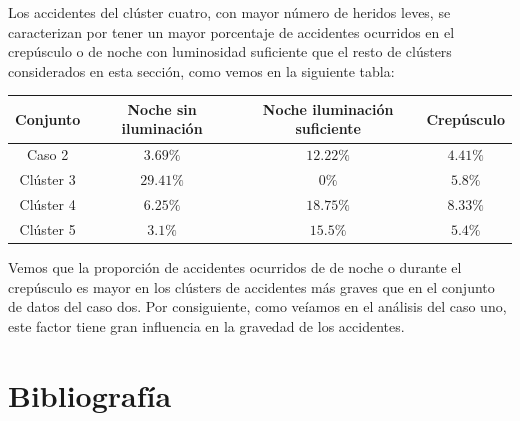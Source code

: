 \documentclass[a4]{article}
\begin{document}
Los accidentes del clúster cuatro, con mayor número de heridos leves, se caracterizan por tener un mayor porcentaje de accidentes ocurridos en el crepúsculo o de noche con luminosidad suficiente que el resto de clústers considerados en esta sección, como vemos en la siguiente tabla:

\begin{center}
\begin{tabular}{|c|c|c|c|}
\hline
  \multicolumn{1}{|c|}{\textbf{Conjunto}} & \textbf{Noche sin iluminación} & \textbf{Noche iluminación suficiente} &  \textbf{Crepúsculo}\\ \hline
  Caso 2    & $3.69 \%$ & $12.22\%$ & $4.41 \%$ \\ \hline
  Clúster 3 & $29.41\%$ & $0    \%$ & $5.8  \%$ \\ \hline
  Clúster 4 & $6.25 \%$ & $18.75\%$ & $8.33 \%$ \\ \hline
  Clúster 5 & $3.1  \%$ & $15.5 \%$ & $5.4  \%$ \\ \hline
\end{tabular}
\end{center}

Vemos que la proporción de accidentes ocurridos de de noche o durante el crepúsculo es mayor en los clústers de accidentes más graves que en el conjunto de datos del caso dos. Por consiguiente, como veíamos en el análisis del caso uno, este factor tiene gran influencia en la gravedad de los accidentes.

\section{Bibliografía}
\end{document}

